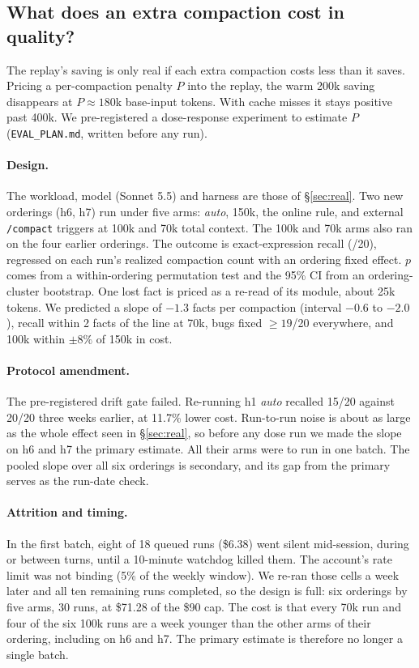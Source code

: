 \documentclass[11pt]{article}
\begin{document}
\subsection{What does an extra compaction cost in quality?}\label{sec:dose}
The replay's saving is only real if each extra compaction costs less than it saves. Pricing a per-compaction penalty $P$ into the replay, the warm 200k saving disappears at $P\approx180$k base-input tokens. With cache misses it stays positive past 400k. We pre-registered a dose-response experiment to estimate $P$ (\texttt{EVAL\_PLAN.md}, written before any run).

\paragraph{Design.} The workload, model (Sonnet 5.5) and harness are those of \S\ref{sec:real}. Two new orderings (h6, h7) run under five arms: \emph{auto}, 150k, the online rule, and external \texttt{/compact} triggers at 100k and 70k total context. The 100k and 70k arms also ran on the four earlier orderings. The outcome is exact-expression recall (/20), regressed on each run's realized compaction count with an ordering fixed effect. $p$ comes from a within-ordering permutation test and the 95\% CI from an ordering-cluster bootstrap. One lost fact is priced as a re-read of its module, about 25k tokens. We predicted a slope of $-1.3$ facts per compaction (interval $-0.6$ to $-2.0$), recall within 2 facts of the line at 70k, bugs fixed $\ge19$/20 everywhere, and 100k within $\pm8\%$ of 150k in cost.

\paragraph{Protocol amendment.} The pre-registered drift gate failed. Re-running h1 \emph{auto} recalled 15/20 against 20/20 three weeks earlier, at 11.7\% lower cost. Run-to-run noise is about as large as the whole effect seen in \S\ref{sec:real}, so before any dose run we made the slope on h6 and h7 the primary estimate. All their arms were to run in one batch. The pooled slope over all six orderings is secondary, and its gap from the primary serves as the run-date check.

\paragraph{Attrition and timing.} In the first batch, eight of 18 queued runs (\$6.38) went silent mid-session, during or between turns, until a 10-minute watchdog killed them. The account's rate limit was not binding (5\% of the weekly window). We re-ran those cells a week later and all ten remaining runs completed, so the design is full: six orderings by five arms, 30 runs, at \$71.28 of the \$90 cap. The cost is that every 70k run and four of the six 100k runs are a week younger than the other arms of their ordering, including on h6 and h7. The primary estimate is therefore no longer a single batch.
\end{document}
